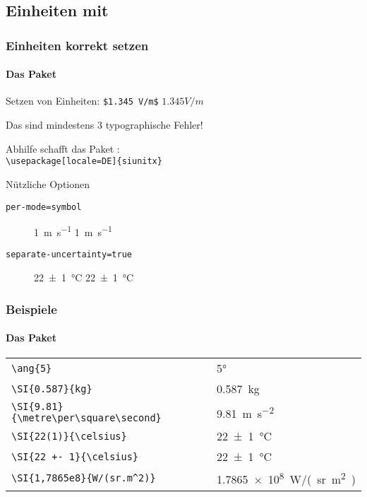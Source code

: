 \subsection{Einheiten mit }

\begin{frame}[fragile]
    \frametitle{Einheiten korrekt setzen}
    \framesubtitle{Das Paket }
    Setzen von Einheiten: \verb+$1.345 V/m$+ \textrightarrow{} $1.345 V/m$
    
    \medskip
    Das sind mindestens 3 typographische Fehler!
    
    \bigskip\pause
    Abhilfe schafft das Paket :\\
    \verb+\usepackage[locale=DE]{siunitx}+
    
    \medskip\pause
    \begin{block}{Nützliche Optionen}
        \begin{description}
            \item[\texttt{per-mode=symbol}] \SI{1}{\metre\per\second} \textrightarrow{} \SI[per-mode=symbol]{1}{\metre\per\second}
            \item[\texttt{separate-uncertainty=true}] \SI{22 +- 1}{\celsius} \textrightarrow{} \SI[separate-uncertainty=true]{22 +- 1}{\celsius}
    \end{description}
    \end{block}
\end{frame}

\begin{frame}[fragile]
\frametitle{Beispiele}
\framesubtitle{Das Paket }
    \begin{tabular}{ll}
        \verb+\ang{5}+ & \ang{5}\\
        \verb+\SI{0.587}{kg}+ & \SI{0.587}{kg}\\
        \verb+\SI{9.81}{\metre\per\square\second}+ & \SI{9.81}{\metre\per\square\second}\\
        \verb|\SI{22(1)}{\celsius}| & \SI[separate-uncertainty=true]{22(1)}{\celsius}\\
        \verb|\SI{22 +- 1}{\celsius}| & \SI[separate-uncertainty=true]{22(1)}{\celsius}\\
        \verb+\SI{1,7865e8}{W/(sr.m^2)}+ & \SI{1,7865e8}{W/(sr.m^2)}\\
    \end{tabular}
\end{frame}
